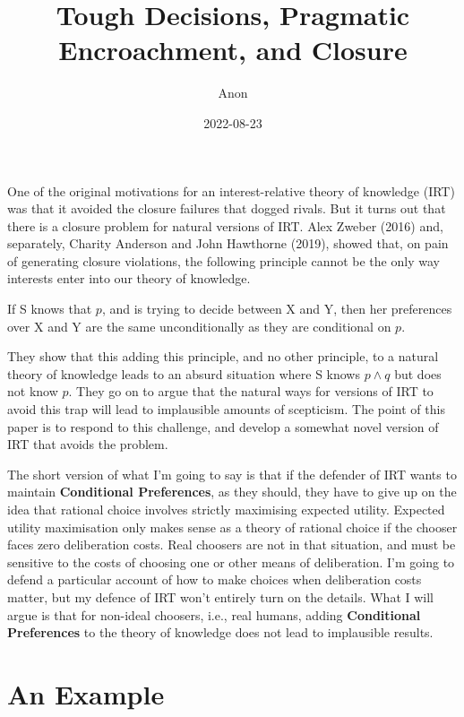 \documentclass[
  12pt,
]{article}
\title{Tough Decisions, Pragmatic Encroachment, and Closure}
\author{Anon}
\date{2022-08-23}
\providecommand{\tightlist}{%
  \setlength{\itemsep}{0pt}\setlength{\parskip}{0pt}}
\begin{document}
\maketitle

One of the original motivations for an interest-relative theory of knowledge (IRT) was that it avoided the closure failures that dogged rivals. But it turns out that there is a closure problem for natural versions of IRT. Alex Zweber (2016) and, separately, Charity Anderson and John Hawthorne (2019), showed that, on pain of generating closure violations, the following principle cannot be the only way interests enter into our theory of knowledge.

\begin{description}
\tightlist
\item[Conditional Preferences]
If S knows that \(p\), and is trying to decide between X and Y, then her preferences over X and Y are the same unconditionally as they are conditional on \(p\).
\end{description}

They show that this adding this principle, and no other principle, to a natural theory of knowledge leads to an absurd situation where S knows \(p \wedge q\) but does not know \(p\). They go on to argue that the natural ways for versions of IRT to avoid this trap will lead to implausible amounts of scepticism. The point of this paper is to respond to this challenge, and develop a somewhat novel version of IRT that avoids the problem.

The short version of what I'm going to say is that if the defender of IRT wants to maintain \textbf{Conditional Preferences}, as they should, they have to give up on the idea that rational choice involves strictly maximising expected utility. Expected utility maximisation only makes sense as a theory of rational choice if the chooser faces zero deliberation costs. Real choosers are not in that situation, and must be sensitive to the costs of choosing one or other means of deliberation. I'm going to defend a particular account of how to make choices when deliberation costs matter, but my defence of IRT won't entirely turn on the details. What I will argue is that for non-ideal choosers, i.e., real humans, adding \textbf{Conditional Preferences} to the theory of knowledge does not lead to implausible results.

\hypertarget{frankielee}{%
\section{An Example}\label{frankielee}}
\end{document}
